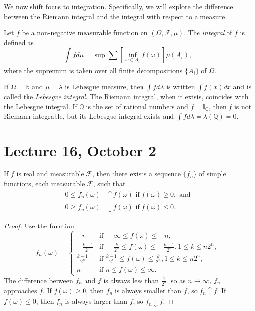 \documentclass[11pt,fleqn]{book} %
\begin{document}
We now shift focus to integration. Specifically, we will explore the difference between the Riemann integral and the integral with respect to a measure.

\begin{definition} \label{def:measure-integral}
	Let $f$ be a non-negative measurable function on $(\Omega,\mathcal{F},\mu)$. The \emph{integral} of $f$ is defined as
	\[
		\int f d\mu = \sup \sum_i \left[ \inf_{\omega \in A_i} f(\omega) \right] \mu(A_i),
	\]
	where the supremum is taken over all finite decompositions $\{A_i\}$ of $\Omega$.
\end{definition}

If $\Omega = \mathbb{R}$ and $\mu = \lambda$ is Lebesgue measure, then $\int f d\lambda$ is written $\int f(x) dx$ and is called the \emph{Lebesgue integral}. The Riemann integral, when it exists, coincides with the Lebesgue integral. If $\mathbb{Q}$ is the set of rational numbers and $f = \mathbb{I}_{\mathbb{Q}}$, then $f$ is not Riemann integrable, but its Lebesgue integral exists and $\int f d\lambda = \lambda(\mathbb{Q}) = 0$.

\section{Lecture 16, October 2}

\begin{theorem} \label{thm:measurable-sequence}
	If $f$ is real and measurable $\mathcal{F}$, then there exists a sequence $\{f_n\}$ of simple functions, each measurable $\mathcal{F}$, such that
	\begin{align*}
		0 \leq f_n(\omega) &\uparrow f(\omega) \textrm{ if } f(\omega) \geq 0, \textrm{ and} \\
		0 \geq f_n(\omega) &\downarrow f(\omega) \textrm{ if } f(\omega) \leq 0.
	\end{align*}
\end{theorem}

\begin{proof}
	Use the function
	\[
		f_n(\omega) = \begin{cases}
			-n & \textrm{if } -\infty \leq f(\omega) \leq -n, \\
			-\frac{k-1}{2^n} & \textrm{if } -\frac{k}{2^n} \leq f(\omega) \leq -\frac{k-1}{2^n}, 1 \leq k \leq n2^n, \\
			\frac{k-1}{2^n} & \textrm{if } \frac{k-1}{2^n} \leq f(\omega) \leq \frac{k}{2^n}, 1 \leq k \leq n2^n, \\
			n & \textrm{if } n \leq f(\omega) \leq \infty.
		\end{cases}
	\]
	The difference between $f_n$ and $f$ is always less than $\frac{1}{2^n}$, so as $n \to \infty$, $f_n$ approaches $f$. If $f(\omega) \geq 0$, then $f_n$ is always smaller than $f$, so $f_n \uparrow f$. If $f(\omega) \leq 0$, then $f_n$ is always larger than $f$, so $f_n \downarrow f$.
\end{proof}
\end{document}
